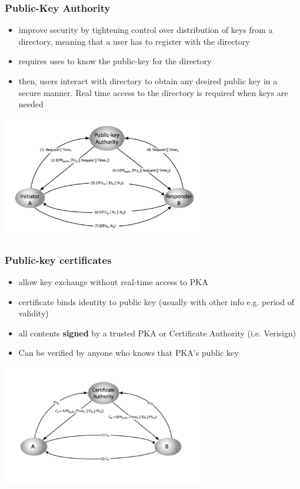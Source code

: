 \documentclass{article}
\begin{document}
\subsubsection{Public-Key Authority}
\begin{itemize}
    \item improve security by tightening control over distribution of keys from a directory, meaning that a user has to register with the directory
    \item requires uses to know the public-key for the directory
    \item then, users interact with directory to obtain any desired public key in a secure manner. Real time access to the directory is required when keys are needed
\end{itemize}
\includegraphics[width= 250pt]{pka.png}
\subsubsection{Public-key certificates}
\begin{itemize}
    \item allow key exchange without real-time access to PKA
    \item certificate binds identity to public key (usually with other info e.g. period of validity)
    \item all contents \textbf{signed} by a trusted PKA or Certificate Authority (i.e. Verisign)
    \item Can be verified by anyone who knows that PKA's public key
\end{itemize}
\includegraphics[width= 250pt]{ca.png}
\end{document}
